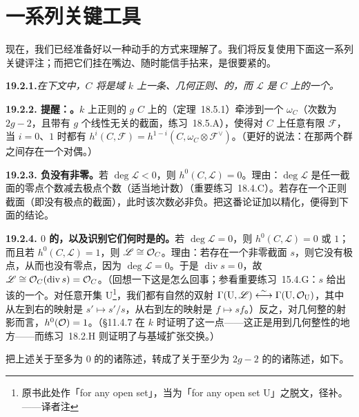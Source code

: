 
\section{一系列关键工具}

现在，我们已经准备好以一种动手的方式来理解\trCurve{}了。我们将反复使用下面这一系列关键评注；而把它们挂在嘴边、随时能信手拈来，是很要紧的。

\textbf{19.2.1.}\quad \emph{在下文中，$C$ 将是域 $k$ 上一条\trProjective{}、几何正则、\trGeometricallyIntegral{}的\trCurve，而 $\mathscr{L}$ 是 $C$ 上的一个\trInvertibleSheaf。}

\textbf{19.2.2. 提醒：\trSerreDuality。}\quad $k$ 上\trGeometricallyIrreducible{}正则的\trGenus{} $g$ \trCurve{} $C$ 上的\trSerreDuality（\mbox{定理~18.5.1}）牵涉到一个\trInvertibleSheaf{} $\omega_C$（次数为 $2g-2$，且带有 $g$ 个线性无关的截面，\mbox{练习~18.5.A}），使得对 $C$ 上任意有限\trRank{}\trLocallyFreeSheaf{} $\mathscr{F}$，当 $i=0$、$1$ 时都有 $h^i(C,\mathscr{F})=h^{1-i}(C,\omega_C\otimes\mathscr{F}^{\vee})$。（更好的说法：在那两个\trCohomology{}群之间存在一个对偶。）

\textbf{19.2.3. 负\trDegree{}\trLineBundle{}没有非零\trSection。}\quad 若 $\deg\mathscr{L}<0$，则 $h^0(C,\mathscr{L})=0$。理由：$\deg\mathscr{L}$ 是任一\trRational{}截面的零点个数减去极点个数（适当地计数）（\mbox{重要练习~18.4.C}）。若存在一个正则截面（即没有极点的截面），此时该次数必非负。把这番论证加以精化，便得到下面的结论。

\textbf{19.2.4. \trDegree{} $0$ 的\trLineBundle，以及识别它们何时是\trTrivial{}的。}\quad 若 $\deg\mathscr{L}=0$，则 $h^0(C,\mathscr{L})=0$ 或 $1$；而且若 $h^0(C,\mathscr{L})=1$，则 $\mathscr{L}\cong\mathcal{O}_C$。理由：若存在一个非零截面 $s$，则它没有极点，从而也没有零点，因为 $\deg\mathscr{L}=0$。于是 $\operatorname{div}s=0$，故 $\mathscr{L}\cong\mathcal{O}_C(\operatorname{div}s)=\mathcal{O}_C$。（回想一下这是怎么回事；参看\mbox{重要练习~15.4.G}：$s$ 给出该\trInvertibleSheaf{}的一个\trTrivialization。对任意开集 $\mathrm{U}$\footnote{原书此处作「for any open set」，当为「for any open set U」之脱文，径补。——译者注}，我们都有自然的双射 $\Gamma(\mathrm{U},\mathscr{L})\overset{\sim}{\longleftrightarrow}\Gamma(\mathrm{U},\mathcal{O}_{\mathrm{U}})$，其中从左到右的映射是 $s'\mapsto s'/s$，从右到左的映射是 $f\mapsto sf$。）反之，对几何整的射影\trVariety{}而言，$h^0(\mathcal{O})=1$。（\S11.4.7 在 $k$ \trAlgClosed{}时证明了这一点——这正是用到几何整性的地方——而\mbox{练习~18.2.H} 则证明了\trCohomology{}与基域扩张交换。）

\trSerreDuality{}把上述关于\trDegree{}至多为 $0$ 的\trLineBundle{}的诸陈述，转成了关于\trDegree{}至少为 $2g-2$ 的\trLineBundle{}的诸陈述，如下。

